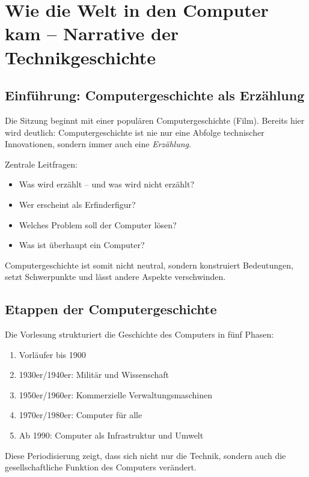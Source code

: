 \section{Wie die Welt in den Computer kam – Narrative der Technikgeschichte}

\subsection{Einführung: Computergeschichte als Erzählung}

Die Sitzung beginnt mit einer populären Computergeschichte (Film). 
Bereits hier wird deutlich: Computergeschichte ist nie nur eine Abfolge technischer Innovationen, 
sondern immer auch eine \textit{Erzählung}.

Zentrale Leitfragen:

\begin{itemize}
    \item Was wird erzählt – und was wird nicht erzählt?
    \item Wer erscheint als Erfinderfigur?
    \item Welches Problem soll der Computer lösen?
    \item Was ist überhaupt ein Computer?
\end{itemize}

Computergeschichte ist somit nicht neutral, sondern konstruiert Bedeutungen, 
setzt Schwerpunkte und lässt andere Aspekte verschwinden.

\subsection{Etappen der Computergeschichte}

Die Vorlesung strukturiert die Geschichte des Computers in fünf Phasen:

\begin{enumerate}
    \item Vorläufer bis 1900
    \item 1930er/1940er: Militär und Wissenschaft
    \item 1950er/1960er: Kommerzielle Verwaltungsmaschinen
    \item 1970er/1980er: Computer für alle
    \item Ab 1990: Computer als Infrastruktur und Umwelt
\end{enumerate}

Diese Periodisierung zeigt, dass sich nicht nur die Technik, sondern auch 
die gesellschaftliche Funktion des Computers verändert.


